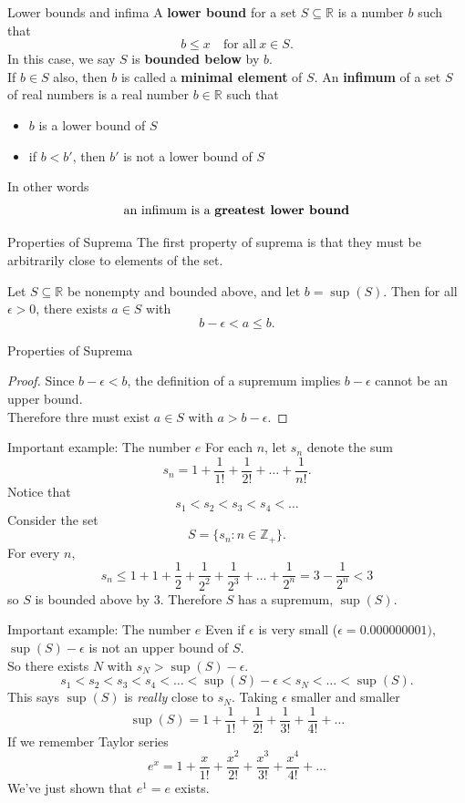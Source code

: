 \documentclass{beamer}
\begin{document}
\begin{frame}{Lower bounds and infima}
A \textbf{lower bound} for a set $S\subseteq\mathbb{R}$ is a number $b$ such that
$$b \leq x\quad\text{for all}\ x\in S.$$
\pause
In this case, we say $S$ is \textbf{bounded below} by $b$.\\
\pause
If $b\in S$ also, then $b$ is called a \textbf{minimal element} of $S$.
\pause
An \textbf{infimum} of a set $S$ of real numbers is a real number $b\in\mathbb{R}$ such that
\begin{itemize}
\item $b$ is a lower bound of $S$
\item if $b<b'$, then $b'$ is not a lower bound of $S$
\end{itemize}
\pause
In other words
$$\text{an infimum is a \bf{greatest lower bound}}$$
\end{frame}

\begin{frame}{Properties of Suprema}
The first property of suprema is that they must be arbitrarily close to elements of the set.
\begin{thm}
Let $S\subseteq\mathbb{R}$ be nonempty and bounded above, and let $b = \sup(S)$.
Then for all $\epsilon > 0$, there exists $a\in S$ with
$$b-\epsilon < a \leq b.$$
\end{thm}
\end{frame}
\begin{frame}{Properties of Suprema}
\begin{proof}
Since $b-\epsilon < b$, the definition of a supremum implies $b-\epsilon$ cannot be an upper bound.\\
\pause
Therefore thre must exist $a\in S$ with $a > b-\epsilon$.
\end{proof}
\end{frame}

\begin{frame}{Important example: The number $e$}
For each $n$, let $s_n$ denote the sum
$$s_n = 1 + \frac{1}{1!} + \frac{1}{2!} + \dots + \frac{1}{n!}.$$
\pause
Notice that
$$s_1 < s_2 < s_3 < s_4 < \dots$$
\pause
Consider the set
$$S = \{ s_n: n\in\mathbb{Z}_+\}.$$
\pause
For every $n$, 
$$s_n \leq 1 + 1 + \frac{1}{2} + \frac{1}{2^2} + \frac{1}{2^3} + \dots + \frac{1}{2^n} = 3 - \frac{1}{2^{n}} < 3$$
so $S$ is bounded above by $3$.
\pause
Therefore $S$ has a supremum, $\sup(S)$.
\end{frame}

\begin{frame}{Important example: The number $e$}
Even if $\epsilon$ is very small ($\epsilon = 0.000000001)$, $\sup(S)-\epsilon$ is not an upper bound of $S$.\\
\pause
So there exists $N$ with $s_N > \sup(S)-\epsilon$.
\pause
$$s_1 < s_2 < s_3 < s_4 < \dots < \sup(S)-\epsilon < s_N < \dots < \sup(S).$$
\pause
This says $\sup(S)$ is \emph{really} close to $s_N$.
\pause
Taking $\epsilon$ smaller and smaller
\pause
$$\sup(S) = 1 + \frac{1}{1!} + \frac{1}{2!} + \frac{1}{3!} + \frac{1}{4!}  + \dots$$
\pause
If we remember Taylor series
\pause
$$e^x = 1 + \frac{x}{1!} + \frac{x^2}{2!} + \frac{x^3}{3!} + \frac{x^4}{4!}  + \dots$$
\pause
We've just shown that $e^1=e$ exists.
\end{frame}
\end{document}
